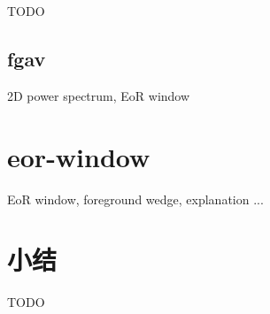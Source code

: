 TODO

\subsection{\acl{fgav}}  %

2D power spectrum, EoR window


\section{\acl{eor-window}}  %
\label{sec:eor-window}

EoR window, foreground wedge, explanation ...


\section{小结}

TODO


